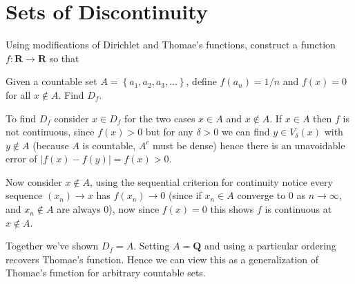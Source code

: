 \section{Sets of Discontinuity}


\begin{exercise}
  Using modifications of Dirichlet and Thomae's functions, construct a function $f: \mathbf{R} \rightarrow \mathbf{R}$ so that
\end{exercise}
\begin{solution}
\end{solution}

\begin{exercise}
  Given a countable set $A=\left\{a_{1}, a_{2}, a_{3}, \ldots\right\}$, define $f\left(a_{n}\right)=1 / n$ and $f(x)=0$ for all $x \notin A$. Find $D_{f}$.
\end{exercise}
\begin{solution}
  To find $D_f$ consider $x \in D_f$ for the two cases $x \in A$ and $x \notin A$.
  If $x \in A$ then $f$ is not continuous, since $f(x) > 0$ but for any $\delta > 0$ we can find $y \in V_\delta(x)$ with $y \notin A$ (because $A$ is countable, $A^c$ must be dense) hence there is an unavoidable error of $|f(x)-f(y)| = f(x) > 0$.

  Now consider $x \notin A$, using the sequential criterion for continuity notice every sequence $(x_n) \to x$ has $f(x_n) \to 0$ (since if $x_n \in A$ converge to $0$ as $n \to \infty$, and $x_n \notin A$ are always $0$), now since $f(x)=0$ this shows $f$ is continuous at $x \notin A$.

  Together we've shown $D_f = A$. Setting $A = \mathbf{Q}$ and using a particular ordering recovers Thomae's function. Hence we can view this as a generalization of Thomae's function for arbitrary countable sets.
\end{solution}

